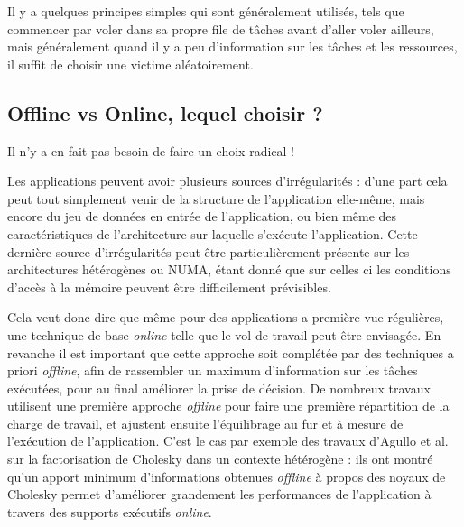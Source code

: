 Il y a quelques principes simples qui sont généralement utilisés, tels que commencer par voler dans sa propre file de tâches avant d'aller voler ailleurs, mais généralement quand il y a peu d'information sur les tâches et les ressources, il suffit de choisir une victime aléatoirement.


\subsection{Offline vs Online, lequel choisir ?}

Il n'y a en fait pas besoin de faire un choix radical !

Les applications peuvent avoir plusieurs sources d'irrégularités : d'une part cela peut tout simplement venir de la structure de l'application elle-même, mais encore du jeu de données en entrée de l'application, ou bien même des caractéristiques de l'architecture sur laquelle s'exécute l'application.
Cette dernière source d'irrégularités peut être particulièrement présente sur les architectures hétérogènes ou NUMA, étant donné que sur celles ci les conditions d'accès à la mémoire peuvent être difficilement prévisibles.

Cela veut donc dire que même pour des applications a première vue régulières, une technique de base \emph{online} telle que le vol de travail peut être envisagée.
En revanche il est important que cette approche soit complétée par des techniques a priori \emph{offline}, afin de rassembler un maximum d'information sur les tâches exécutées, pour au final améliorer la prise de décision.
De nombreux travaux utilisent une première approche \emph{offline} pour faire une première répartition de la charge de travail, et ajustent ensuite l'équilibrage au fur et à mesure de l'exécution de l'application.
C'est le cas par exemple des travaux d'Agullo et al.~\cite{Agullo2016} sur la factorisation de Cholesky dans un contexte hétérogène : ils ont montré qu'un apport minimum d'informations obtenues \emph{offline} à propos des noyaux de Cholesky permet d'améliorer grandement les performances de l'application à travers des supports exécutifs \emph{online}.



